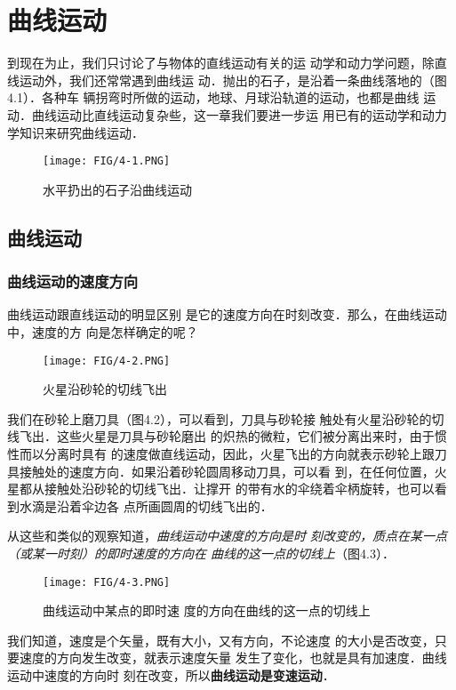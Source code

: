 \chapter{曲线运动}
    到现在为止，我们只讨论了与物体的直线运动有关的运
动学和动力学问题，除直线运动外，我们还常常遇到曲线运
动．抛出的石子，是沿着一条曲线落地的（图4.1）．各种车
辆拐弯时所做的运动，地球、月球沿轨道的运动，也都是曲线
运动．曲线运动比直线运动复杂些，这一章我们要进一步运
用已有的运动学和动力学知识来研究曲线运动．

\begin{figure}[htp]
\centering
\texttt{[image: FIG/4-1.PNG]}
\caption{水平扔出的石子沿曲线运动}
\end{figure}

\section{曲线运动}
    \subsection{曲线运动的速度方向}
    
    曲线运动跟直线运动的明显区别
是它的速度方向在时刻改变．那么，在曲线运动中，速度的方
向是怎样确定的呢？

\begin{figure}[htp]
    \centering
    \texttt{[image: FIG/4-2.PNG]}
    \caption{火星沿砂轮的切线飞出}
    \end{figure}

    我们在砂轮上磨刀具（图4.2），可以看到，刀具与砂轮接
触处有火星沿砂轮的切线飞出．这些火星是刀具与砂轮磨出
的炽热的微粒，它们被分离出来时，由于惯性而以分离时具有
的速度做直线运动，因此，火星飞出的方向就表示砂轮上跟刀
具接触处的速度方向．如果沿着砂轮圆周移动刀具，可以看
到，在任何位置，火星都从接触处沿砂轮的切线飞出．让撑开
的带有水的伞绕着伞柄旋转，也可以看到水滴是沿着伞边各
点所画圆周的切线飞出的．

从这些和类似的观察知道，\textit{曲线运动中速度的方向是时
刻改变的，质点在某一点（或某一时刻）的即时速度的方向在
曲线的这一点的切线上}（图4.3）．

\begin{figure}[htp]
    \centering
    \texttt{[image: FIG/4-3.PNG]}
    \caption{曲线运动中某点的即时速
度的方向在曲线的这一点的切线上}
    \end{figure}

我们知道，速度是个矢量，既有大小，又有方向，不论速度
的大小是否改变，只要速度的方向发生改变，就表示速度矢量
发生了变化，也就是具有加速度．曲线运动中速度的方向时
刻在改变，所以\textbf{曲线运动是变速运动}．

